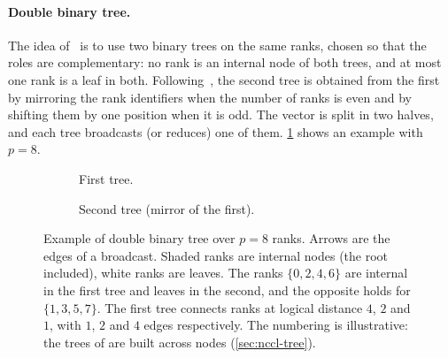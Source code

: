 \paragraph{Double binary tree.}
The idea of~\cite{sanders2009twotree} is to use two binary trees on the same ranks, chosen so that the roles are complementary: no rank is an internal node of both trees, and at most one rank is a leaf in both.
Following~\cite{hu2025demystifying}, the second tree is obtained from the first by mirroring the rank identifiers when the number of ranks is even and by shifting them by one position when it is odd.
The vector is split in two halves, and each tree broadcasts (or reduces) one of them.
\cref{fig:bg-double-tree} shows an example with $p=8$.
\begin{figure}[t]
  \centering
  \begin{subfigure}[t]{0.48\linewidth}
    \centering
    \caption{First tree.}
  \end{subfigure}\hfill
  \begin{subfigure}[t]{0.48\linewidth}
    \centering
    \caption{Second tree (mirror of the first).}
  \end{subfigure}
  \caption{Example of double binary tree over $p=8$ ranks. Arrows are the edges of a broadcast. Shaded ranks are internal nodes (the root included), white ranks are leaves. The ranks $\{0,2,4,6\}$ are internal in the first tree and leaves in the second, and the opposite holds for $\{1,3,5,7\}$. The first tree connects ranks at logical distance $4$, $2$ and $1$, with $1$, $2$ and $4$ edges respectively. The numbering is illustrative: the trees of \nccl{} are built across nodes (\cref{sec:nccl-tree}).}
  \label{fig:bg-double-tree}
\end{figure}
